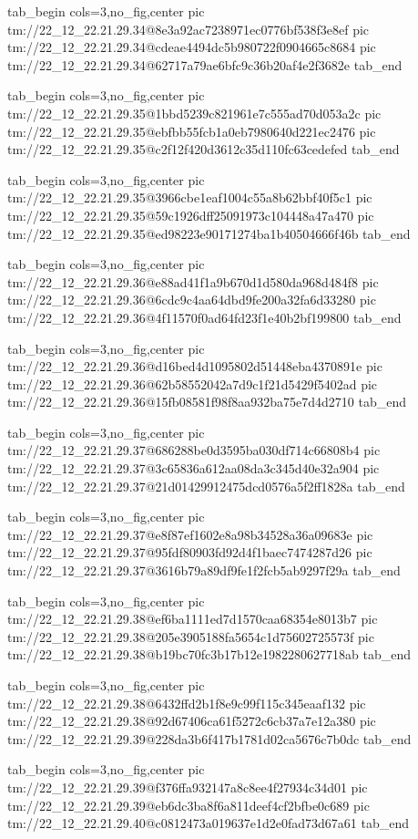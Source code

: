 \ifcmt
  tab_begin cols=3,no_fig,center
    pic tm://22_12_22.21.29.34@8e3a92ac7238971ec0776bf538f3e8ef
    pic tm://22_12_22.21.29.34@cdeae4494dc5b980722f0904665c8684
    pic tm://22_12_22.21.29.34@62717a79ae6bfc9c36b20af4e2f3682e
  tab_end
\fi


\ifcmt
  tab_begin cols=3,no_fig,center
    pic tm://22_12_22.21.29.35@1bbd5239c821961e7c555ad70d053a2c
    pic tm://22_12_22.21.29.35@ebfbb55fcb1a0eb7980640d221ec2476
    pic tm://22_12_22.21.29.35@c2f12f420d3612c35d110fc63cedefed
  tab_end
\fi


\ifcmt
  tab_begin cols=3,no_fig,center
    pic tm://22_12_22.21.29.35@3966cbe1eaf1004c55a8b62bbf40f5c1
    pic tm://22_12_22.21.29.35@59c1926dff25091973c104448a47a470
    pic tm://22_12_22.21.29.35@ed98223e90171274ba1b40504666f46b
  tab_end
\fi


\ifcmt
  tab_begin cols=3,no_fig,center
    pic tm://22_12_22.21.29.36@e88ad41f1a9b670d1d580da968d484f8
    pic tm://22_12_22.21.29.36@6cdc9c4aa64dbd9fe200a32fa6d33280
    pic tm://22_12_22.21.29.36@4f11570f0ad64fd23f1e40b2bf199800
  tab_end
\fi


\ifcmt
  tab_begin cols=3,no_fig,center
    pic tm://22_12_22.21.29.36@d16bed4d1095802d51448eba4370891e
    pic tm://22_12_22.21.29.36@62b58552042a7d9c1f21d5429f5402ad
    pic tm://22_12_22.21.29.36@15fb08581f98f8aa932ba75e7d4d2710
  tab_end
\fi


\ifcmt
  tab_begin cols=3,no_fig,center
    pic tm://22_12_22.21.29.37@686288be0d3595ba030df714c66808b4
    pic tm://22_12_22.21.29.37@3c65836a612aa08da3c345d40e32a904
    pic tm://22_12_22.21.29.37@21d01429912475dcd0576a5f2ff1828a
  tab_end
\fi


\ifcmt
  tab_begin cols=3,no_fig,center
    pic tm://22_12_22.21.29.37@e8f87ef1602e8a98b34528a36a09683e
    pic tm://22_12_22.21.29.37@95fdf80903fd92d4f1baec7474287d26
    pic tm://22_12_22.21.29.37@3616b79a89df9fe1f2fcb5ab9297f29a
  tab_end
\fi


\ifcmt
  tab_begin cols=3,no_fig,center
    pic tm://22_12_22.21.29.38@ef6ba1111ed7d1570caa68354e8013b7
    pic tm://22_12_22.21.29.38@205e3905188fa5654c1d75602725573f
    pic tm://22_12_22.21.29.38@b19bc70fc3b17b12e1982280627718ab
  tab_end
\fi


\ifcmt
  tab_begin cols=3,no_fig,center
    pic tm://22_12_22.21.29.38@6432ffd2b1f8e9c99f115c345eaaf132
    pic tm://22_12_22.21.29.38@92d67406ca61f5272c6cb37a7e12a380
    pic tm://22_12_22.21.29.39@228da3b6f417b1781d02ca5676c7b0dc
  tab_end
\fi


\ifcmt
  tab_begin cols=3,no_fig,center
    pic tm://22_12_22.21.29.39@f376ffa932147a8c8ee4f27934c34d01
    pic tm://22_12_22.21.29.39@eb6dc3ba8f6a811deef4cf2bfbe0c689
    pic tm://22_12_22.21.29.40@c0812473a019637e1d2e0fad73d67a61
  tab_end
\fi


